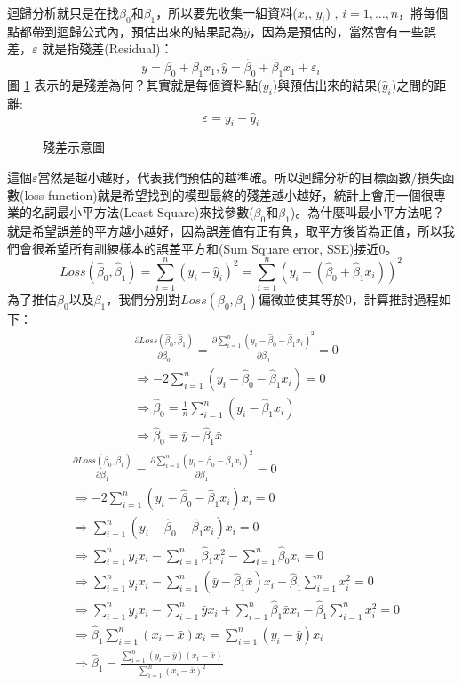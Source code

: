 迴歸分析就只是在找$\beta_0$和$\beta_1$，所以要先收集一組資料($x_i$, $y_i$) , $i=1, …,n$，將每個點都帶到迴歸公式內，預估出來的結果記為$\hat{y}$，因為是預估的，當然會有一些誤差，$\varepsilon$ 就是指殘差(Residual)：
$$y=\beta_0+\beta_1 x_1,\hat{y}=\hat{\beta}_0+\hat{\beta}_1 x_1+\varepsilon_i$$
圖 \ref{fig:simplelinearregression2} 表示的是殘差為何？其實就是每個資料點($y_i$)與預估出來的結果($\hat{y}_i$)之間的距離:
$$\varepsilon=y_i-\hat{y}_i$$
\begin{figure}[H]
    \caption{殘差示意圖}
    \label{fig:simplelinearregression2}
\end{figure}
這個$\varepsilon$當然是越小越好，代表我們預估的越準確。所以迴歸分析的目標函數/損失函數(loss function)就是希望找到的模型最終的殘差越小越好，統計上會用一個很專業的名詞最小平方法(Least Square)來找參數($\beta_0$和$\beta_1$)。為什麼叫最小平方法呢？就是希望誤差的平方越小越好，因為誤差值有正有負，取平方後皆為正值，所以我們會很希望所有訓練樣本的誤差平方和(Sum Square error, SSE)接近0。
$$Loss\left(\hat{\beta}_0,\hat{\beta}_1\right)=\sum_{i=1}^n\left(y_i-\hat{y}_i\right)^2=\sum_{i=1}^n\left(y_i-\left(\hat{\beta}_0+\hat{\beta}_1x_i\right)\right)^2$$
為了推估$\beta_0$以及$\beta_1$，我們分別對$Loss(\beta_0,\beta_1)$偏微並使其等於0，計算推討過程如下：
\begin{align*}
&\frac{\partial Loss\left(\hat{\beta}_0,\hat{\beta}_1\right)}{\partial \beta_0}=\frac{\partial \sum_{i=1}^n\left(y_i-\hat{\beta}_0-\hat{\beta}_1x_i\right)^2}{\partial \beta_0}=0\\
&\Rightarrow -2\sum_{i=1}^n\left(y_i-\hat{\beta}_0-\hat{\beta}_1x_i\right)=0\\
&\Rightarrow \hat{\beta}_0=\frac{1}{n}\sum_{i=1}^n\left(y_i-\hat{\beta}_1x_i\right)\\
&\Rightarrow \hat{\beta}_0=\bar{y}-\hat{\beta}_1\bar{x}
\end{align*}
\begin{align*}
&\frac{\partial Loss\left(\hat{\beta}_0,\hat{\beta}_1\right)}{\partial \beta_1}=\frac{\partial \sum_{i=1}^n\left(y_i-\hat{\beta}_0-\hat{\beta}_1x_i\right)^2}{\partial \beta_1}=0\\
&\Rightarrow -2\sum_{i=1}^n\left(y_i-\hat{\beta}_0-\hat{\beta}_1x_i\right)x_i=0\\
&\Rightarrow \sum_{i=1}^n\left(y_i-\hat{\beta}_0-\hat{\beta}_1x_i\right)x_i=0\\
&\Rightarrow \sum_{i=1}^ny_ix_i-\sum_{i=1}^n\hat{\beta}_1x_i^2-\sum_{i=1}^n\hat{\beta}_0x_i=0\\
&\Rightarrow \sum_{i=1}^ny_ix_i-\sum_{i=1}^n\left(\bar{y}-\hat{\beta}_1\bar{x}\right)x_i-\hat{\beta}_1\sum_{i=1}^nx_i^2=0\\
&\Rightarrow \sum_{i=1}^ny_ix_i-\sum_{i=1}^n\bar{y}x_i+\sum_{i=1}^n\hat{\beta}_1\bar{x}x_i-\hat{\beta}_1\sum_{i=1}^nx_i^2=0\\
&\Rightarrow \hat{\beta}_1\sum_{i=1}^n\left(x_i-\bar{x}\right)x_i=\sum_{i=1}^n\left(y_i-\bar{y}\right)x_i\\
&\Rightarrow \hat{\beta}_1=\frac{\sum_{i=1}^n\left(y_i-\bar{y}\right)\left(x_i-\bar{x}\right)}{\sum_{i=1}^n\left(x_i-\bar{x}\right)^2}\\
\end{align*}
